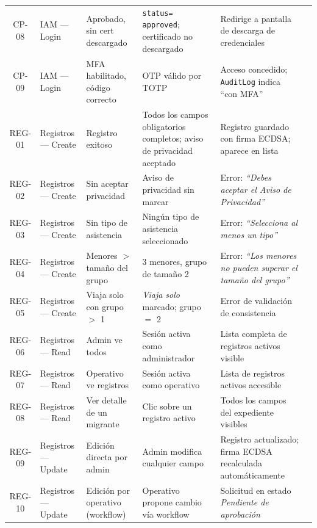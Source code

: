 \documentclass[10pt,letterpaper]{report}
\newcommand{\cmark}{\ding{51}}   %
\begin{document}
\begin{longtable}{c p{1.6cm} p{2.4cm} p{2.8cm} p{3.0cm} c}
CP-08 & IAM --- Login & Aprobado, sin cert descargado & \texttt{status= approved}; certificado no descargado & Redirige a pantalla de descarga de credenciales & \cmark \\[4pt]
CP-09 & IAM --- Login & MFA habilitado, código correcto & OTP válido por TOTP & Acceso concedido; \texttt{AuditLog} indica ``con MFA'' & \cmark \\[4pt]
REG-01 & Registros --- Create & Registro exitoso & Todos los campos obligatorios completos; aviso de privacidad aceptado & Registro guardado con firma ECDSA; aparece en lista & \cmark \\[4pt]
REG-02 & Registros --- Create & Sin aceptar privacidad & Aviso de privacidad sin marcar & Error: \textit{``Debes aceptar el Aviso de Privacidad''} & \cmark \\[4pt]
REG-03 & Registros --- Create & Sin tipo de asistencia & Ningún tipo de asistencia seleccionado & Error: \textit{``Selecciona al menos un tipo''} & \cmark \\[4pt]
REG-04 & Registros --- Create & Menores $>$ tamaño del grupo & 3 menores, grupo de tamaño 2 & Error: \textit{``Los menores no pueden superar el tamaño del grupo''} & \cmark \\[4pt]
REG-05 & Registros --- Create & Viaja solo con grupo $>$ 1 & \textit{Viaja solo} marcado; grupo $=$ 2 & Error de validación de consistencia & \cmark \\[4pt]
REG-06 & Registros --- Read & Admin ve todos & Sesión activa como administrador & Lista completa de registros activos visible & \cmark \\[4pt]
REG-07 & Registros --- Read & Operativo ve registros & Sesión activa como operativo & Lista de registros activos accesible & \cmark \\[4pt]
REG-08 & Registros --- Read & Ver detalle de un migrante & Clic sobre un registro activo & Todos los campos del expediente visibles & \cmark \\[4pt]
REG-09 & Registros --- Update & Edición directa por admin & Admin modifica cualquier campo & Registro actualizado; firma ECDSA recalculada automáticamente & \cmark \\[4pt]
REG-10 & Registros --- Update & Edición por operativo (workflow) & Operativo propone cambio vía workflow & Solicitud en estado \textit{Pendiente de aprobación} & \cmark \\[4pt]

\end{longtable}
\end{document}
